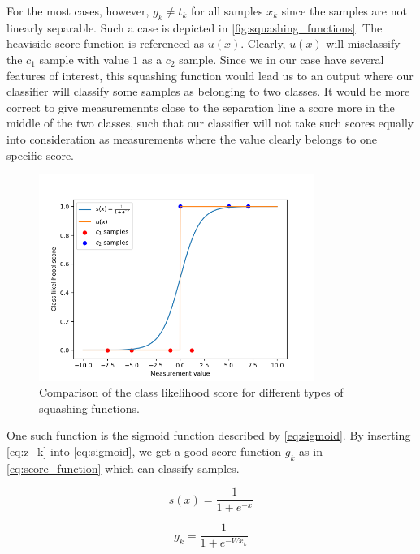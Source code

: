 \documentclass{article}
\begin{document}
For the most cases, however, $g_k \neq t_k $ for all samples $x_k$ since the samples are not linearly
separable. Such a case is depicted in \autoref{fig:squashing_functions}. The heaviside score function is referenced
as $u(x)$. Clearly, $u(x)$ will misclassify the $c_1$ sample with value $1$ as a $c_2$ sample. Since
we in our case have several features of interest, this squashing function would lead us to an output
where our classifier will classify some samples as belonging to two classes. It would be more
correct to give measuremennts close to the separation line a score more in the middle of the two classes,
such that our classifier will not take such scores equally into consideration as measurements where
the value clearly belongs to one specific score.

\begin{figure}
    \centering
    \includegraphics[width=0.8\textwidth]{../images/squashing_functions.png}
    \caption{Comparison of the class likelihood score for different types of squashing functions.}
    \label{fig:squashing_functions}
\end{figure}

One such function is the sigmoid function described by \eqref{eq:sigmoid}. By inserting \eqref{eq:z_k}
into \eqref{eq:sigmoid}, we get a good score function $g_k$ as in \eqref{eq:score_function}
which can classify samples.

\begin{equation}
    s(x) = \frac{1}{1 + e^{-x}} \label{eq:sigmoid}
\end{equation}

\begin{equation}
    g_k = \frac{1}{1 + e^{-Wx_k}} \label{eq:score_function}
\end{equation}
\end{document}

